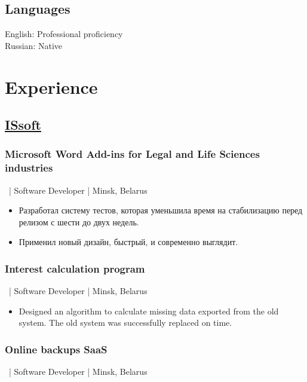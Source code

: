 \documentclass[a4paper]{article}
\begin{document}
\begin{minipage}[t]{0.34\textwidth}
    \subsection*{Languages}
    English: Professional proficiency\\
    Russian: Native

  \end{minipage}
  \hfil
  \begin{minipage}[t]{0.55\textwidth}

    \section*{Experience}
    \subsection*{\href{http://www.issoft.by/}{ISsoft}}
	\subsubsection*{Microsoft Word Add-ins for Legal and Life Sciences industries}
    \ | Software Developer | Minsk, Belarus
	\begin{otherlanguage}{russian}
      \begin{itemize}
        \item Разработал систему тестов, которая уменьшила время на стабилизацию перед релизом с шести до двух недель.
        \item Применил новый дизайн, быстрый, и современно выглядит.
      \end{itemize}
	\end{otherlanguage}
	
	\subsubsection*{Interest calculation program}
    \ | Software Developer | Minsk, Belarus
	\begin{itemize}
      \item Designed an algorithm to calculate missing data exported from the old system. The old system was successfully replaced on time.
    \end{itemize}

	\subsubsection*{Online backups SaaS}
	\ | Software Developer | Minsk, Belarus
	

\end{minipage}
\end{document}
